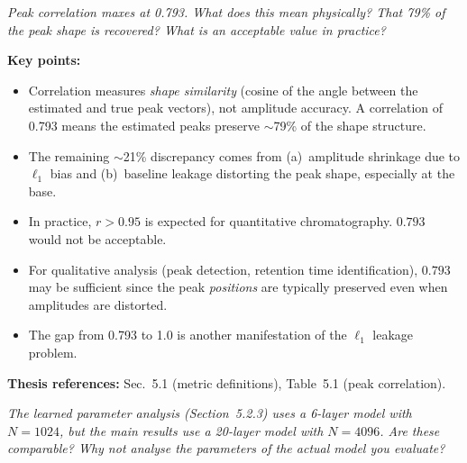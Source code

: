 \documentclass[11pt, letterpaper]{article}
\newcounter{qcounter}
\newcommand{\question}[1]{%
  \stepcounter{qcounter}%
  \begin{questionbox}[Q\theqcounter]%
    \itshape #1%
  \end{questionbox}%
}
\begin{document}
\question{Peak correlation maxes at 0.793.  What does this mean physically?
That 79\% of the peak shape is recovered?  What is an acceptable
value in practice?}

\begin{answerbox}
\textbf{Key points:}
\begin{itemize}[nosep]
  \item Correlation measures \emph{shape similarity} (cosine of the
        angle between the estimated and true peak vectors), not
        amplitude accuracy.  A correlation of 0.793 means the
        estimated peaks preserve $\sim$79\% of the shape structure.
  \item The remaining $\sim$21\% discrepancy comes from
        (a)~amplitude shrinkage due to $\ell_1$ bias and
        (b)~baseline leakage distorting the peak shape, especially
        at the base.
  \item In practice, $r > 0.95$ is expected for quantitative
        chromatography.  $0.793$ would not be acceptable.
  \item For qualitative analysis (peak detection, retention time
        identification), $0.793$ may be sufficient since the peak
        \emph{positions} are typically preserved even when amplitudes
        are distorted.
  \item The gap from 0.793 to 1.0 is another manifestation of the
        $\ell_1$ leakage problem.
\end{itemize}
\textbf{Thesis references:} Sec.~5.1 (metric definitions), Table~5.1 (peak correlation).
\end{answerbox}

\question{The learned parameter analysis (Section~5.2.3) uses a 6-layer
model with $N{=}1024$, but the main results use a 20-layer model
with $N{=}4096$.  Are these comparable?  Why not analyse the
parameters of the actual model you evaluate?}
\end{document}
